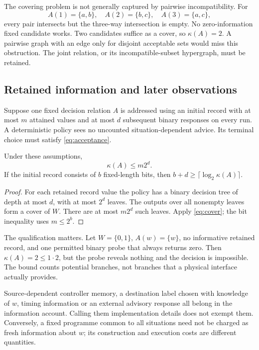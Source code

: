 The covering problem is not generally captured by pairwise incompatibility. For
\begin{equation}
A(1)=\{a,b\},\quad A(2)=\{b,c\},\quad A(3)=\{a,c\},
\end{equation}
every pair intersects but the three-way intersection is empty. No zero-information fixed candidate works. Two candidates suffice as a cover, so \(\kappa(A)=2\). A pairwise graph with an edge only for disjoint acceptable sets would miss this obstruction. The joint relation, or its incompatible-subset hypergraph, must be retained.

\subsection{Retained information and later observations}

Suppose one fixed decision relation \(A\) is addressed using an initial record with at most \(m\) attained values and at most \(d\) subsequent binary responses on every run. A deterministic policy sees no uncounted situation-dependent advice. Its terminal choice must satisfy \eqref{eq:acceptance}.

\begin{proposition}
\label{prop:budget}
Under these assumptions,
\begin{equation}
\kappa(A)\le m2^d.
\label{eq:budget}
\end{equation}
If the initial record consists of \(b\) fixed-length bits, then
\(b+d\ge\lceil\log_2\kappa(A)\rceil\).
\end{proposition}
\begin{proof}
For each retained record value the policy has a binary decision tree of depth at most \(d\), with at most \(2^d\) leaves. The outputs over all nonempty leaves form a cover of \(W\). There are at most \(m2^d\) such leaves. Apply \eqref{eq:cover}; the bit inequality uses \(m\le2^b\).
\end{proof}

The qualification matters. Let \(W=\{0,1\}\), \(A(w)=\{w\}\), no informative retained record, and one permitted binary probe that always returns zero. Then \(\kappa(A)=2\le 1\cdot2\), but the probe reveals nothing and the decision is impossible. The bound counts potential branches, not branches that a physical interface actually provides.

Source-dependent controller memory, a destination label chosen with knowledge of \(w\), timing information or an external advisory response all belong in the information account. Calling them implementation details does not exempt them. Conversely, a fixed programme common to all situations need not be charged as fresh information about \(w\); its construction and execution costs are different quantities.

